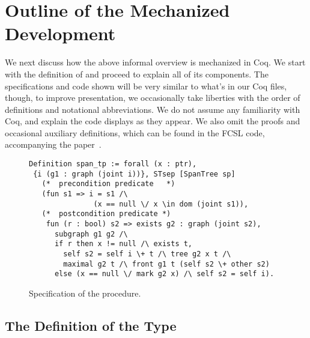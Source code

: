 
\section{Outline of the Mechanized Development}
\label{sec:devel}

We next discuss how the above informal overview is mechanized in
Coq. We start with the definition of  and proceed to
explain all of its components.
%
%
The specifications and code shown will be very similar to what's in
our Coq files, though, to improve presentation, we occasionally take
liberties with the order of definitions and notational
abbreviations. We do not assume any familiarity with Coq, and explain
the code displays as they appear. We also omit the proofs and
occasional auxiliary definitions, which can be found in the FCSL code,
accompanying the paper~\cite{Sergey-al:PLDI15TR}.

{
\setlength{\belowcaptionskip}{-10pt} 
\begin{figure}[t!]
{\centering 
\begin{lstlisting}[basicstyle=\footnotesize\ttfamily]
Definition span_tp := forall (x : ptr),
 {i (g1 : graph (joint i))}, STsep [SpanTree sp] 
   (*  precondition predicate   *)
   (fun s1 => i = s1 /\ 
               (x == null \/ x \in dom (joint s1)), 
   (*  postcondition predicate *)
    fun (r : bool) s2 => exists g2 : graph (joint s2), 
      subgraph g1 g2 /\ 
      if r then x != null /\ exists t,
        self s2 = self i \+ t /\ tree g2 x t /\ 
        maximal g2 t /\ front g1 t (self s2 \+ other s2)
      else (x == null \/ mark g2 x) /\ self s2 = self i). 
\end{lstlisting}
\vspace{-7pt}   
}
\caption{Specification  of the  procedure.}
\label{fig:span_tp}
\end{figure}
}


\subsection{The Definition of the Type~} 

